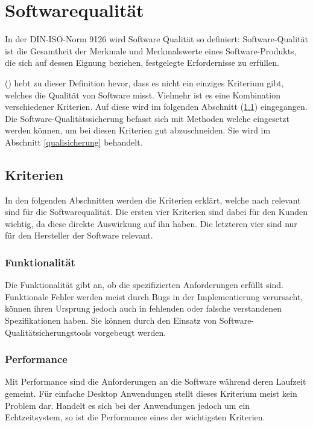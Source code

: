 
\section{Softwarequalität}\label{softwarequality}
In der DIN-ISO-Norm 9126 wird Software Qualität so definiert:
\dq Software-Qualität ist die Gesamtheit der Merkmale und Merkmalswerte eines Software-Produkts, die sich auf dessen Eignung beziehen, festgelegte Erfordernisse zu erfüllen.\dq

\citeauthor{hoffmann2013software} (\citeyear{hoffmann2013software}) hebt zu dieser Definition hevor, dass es nicht ein einziges Kriterium gibt, welches die Qualität von Software misst.
Vielmehr ist es eine Kombination verschiedener Kriterien.
Auf diese wird im folgenden Abschnitt (\ref{kriterien}) eingegangen.
Die Software-Qualitätssicherung befasst sich mit Methoden welche eingesetzt werden können, um bei diesen Kriterien gut abzuschneiden.
Sie wird im Abschnitt \ref{qualisicherung} behandelt.

\subsection{Kriterien}\label{kriterien}
In den folgenden Abschnitten werden die Kriterien erklärt, welche nach \citeauthor{hoffmann2013software} relevant sind für die Softwarequalität.
Die ersten vier Kriterien sind dabei für den Kunden wichtig, da diese direkte Auswirkung auf ihn haben.
Die letzteren vier sind nur für den Hersteller der Software relevant.

\subsubsection{Funktionalität}
Die Funktionalität gibt an, ob die spezifizierten Anforderungen erfüllt sind.
Funktionale Fehler werden meist durch Bugs in der Implementierung verursacht, können ihren Ursprung jedoch auch in fehlenden oder falsche verstandenen Spezifikationen haben.
Sie können durch den Einsatz von Software-Qualitätsicherungstools vorgebeugt werden.

\subsubsection{Performance}\label{qualityPerformance}
Mit Performance sind die Anforderungen an die Software während deren Laufzeit gemeint.
Für einfache Desktop Anwendungen stellt dieses Kriterium meist kein Problem dar.
Handelt es sich bei der Anwendungen jedoch um ein Echtzeitsystem, so ist die Performance eines der wichtigsten Kriterien.

